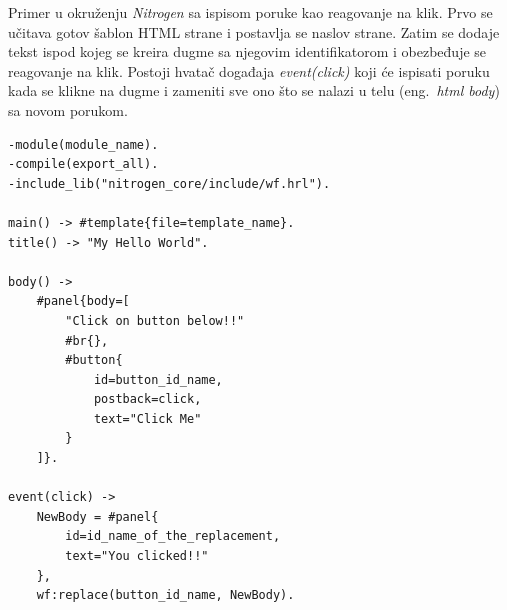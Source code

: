 \documentclass[a4paper]{article}
\begin{document}
Primer u okruženju {\em Nitrogen} sa ispisom poruke kao reagovanje na klik. 
Prvo se učitava gotov šablon HTML strane i postavlja se naslov strane. 
Zatim se dodaje tekst ispod kojeg se kreira dugme sa njegovim identifikatorom i obezbeđuje se reagovanje na klik. 
Postoji hvatač događaja {\em event(click)} koji će ispisati poruku kada se klikne na dugme 
i zameniti sve ono što se nalazi u telu (eng.~{\em html body}) sa novom porukom.
\begin{verbatim}
-module(module_name).
-compile(export_all).
-include_lib("nitrogen_core/include/wf.hrl").

main() -> #template{file=template_name}.
title() -> "My Hello World".

body() ->
    #panel{body=[
        "Click on button below!!"
        #br{},
        #button{
            id=button_id_name,
            postback=click,
            text="Click Me"
        }
    ]}.

event(click) ->
    NewBody = #panel{
        id=id_name_of_the_replacement,
        text="You clicked!!"
    },
    wf:replace(button_id_name, NewBody).
\end{verbatim}
\end{document}
